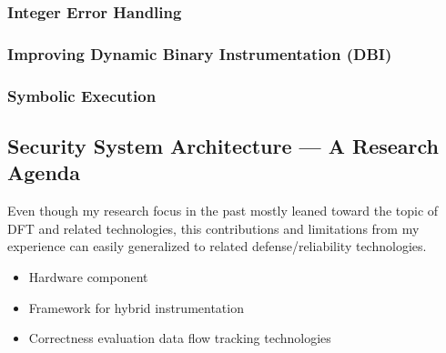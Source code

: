 \documentclass[letterpaper, 10pt]{article}
\begin{document}
\begin{small}
\subsubsection*{Integer Error Handling}

\subsubsection*{Improving Dynamic Binary Instrumentation (DBI)}

\subsubsection*{Symbolic Execution}


\subsection*{Security System Architecture --- A Research Agenda}
Even though my research focus in the past mostly leaned toward the topic of DFT
and related technologies, this contributions and limitations from my experience
can easily generalized to related defense/reliability technologies.

\begin{itemize}
 \item Hardware component
 \item Framework for hybrid instrumentation
 \item Correctness evaluation data flow tracking technologies
\end{itemize}
\end{small}

\newpage



\end{document}
